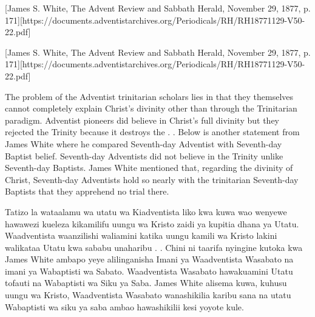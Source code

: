 

[James S. White, The Advent Review and Sabbath Herald, November 29, 1877, p. 171][https://documents.adventistarchives.org/Periodicals/RH/RH18771129-V50-22.pdf]


[James S. White, The Advent Review and Sabbath Herald, November 29, 1877, p. 171][https://documents.adventistarchives.org/Periodicals/RH/RH18771129-V50-22.pdf]


The problem of the Adventist trinitarian scholars lies in that they themselves cannot completely explain Christ’s divinity other than through the Trinitarian paradigm. Adventist pioneers did believe in Christ’s full divinity but they rejected the Trinity because it destroys the . . Below is another statement from James White where he compared Seventh-day Adventist with Seventh-day Baptist belief. Seventh-day Adventists did not believe in the Trinity unlike Seventh-day Baptists. James White mentioned that, regarding the divinity of Christ, Seventh-day Adventists hold so nearly with the trinitarian Seventh-day Baptists that they apprehend no trial there.


Tatizo la wataalamu wa utatu wa Kiadventista liko kwa kuwa wao wenyewe hawawezi kueleza kikamilifu uungu wa Kristo zaidi ya kupitia dhana ya Utatu. Waadventista waanzilishi waliamini katika uungu kamili wa Kristo lakini walikataa Utatu kwa sababu unaharibu . . Chini ni taarifa nyingine kutoka kwa James White ambapo yeye alilinganisha Imani ya Waadventista Wasabato na imani ya Wabaptisti wa Sabato. Waadventista Wasabato hawakuamini Utatu tofauti na Wabaptisti wa Siku ya Saba. James White alisema kuwa, kuhusu uungu wa Kristo, Waadventista Wasabato wanashikilia karibu sana na utatu Wabaptisti wa siku ya saba ambao hawashikilii kesi yoyote kule.


